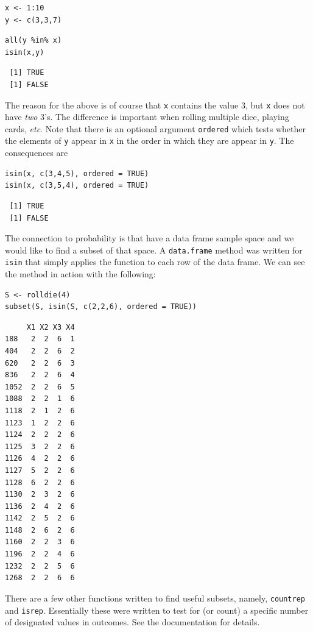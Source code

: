 \documentclass[captions=tableheading]{scrbook}
\begin{document}
\begin{verbatim}
x <- 1:10 
y <- c(3,3,7)
\end{verbatim}


\begin{verbatim}
all(y %in% x)
isin(x,y)
\end{verbatim}

\begin{verbatim}
 [1] TRUE
 [1] FALSE
\end{verbatim}

The reason for the above is of course that \texttt{x} contains the value 3, but \texttt{x} does not have \emph{two} 3's. The difference is important when rolling multiple dice, playing cards, \emph{etc}. Note that there is an optional argument \texttt{ordered} which tests whether the elements of \texttt{y} appear in \texttt{x} in the order in which they are appear in \texttt{y}. The consequences are 


\begin{verbatim}
isin(x, c(3,4,5), ordered = TRUE) 
isin(x, c(3,5,4), ordered = TRUE)
\end{verbatim}

\begin{verbatim}
 [1] TRUE
 [1] FALSE
\end{verbatim}

The connection to probability is that have a data frame sample space and we would like to find a subset of that space. A \texttt{data.frame} method was written for \texttt{isin} that simply applies the function to each row of the data frame. We can see the method in action with the following: 


\begin{verbatim}
S <- rolldie(4) 
subset(S, isin(S, c(2,2,6), ordered = TRUE))
\end{verbatim}


\begin{verbatim}
     X1 X2 X3 X4
188   2  2  6  1
404   2  2  6  2
620   2  2  6  3
836   2  2  6  4
1052  2  2  6  5
1088  2  2  1  6
1118  2  1  2  6
1123  1  2  2  6
1124  2  2  2  6
1125  3  2  2  6
1126  4  2  2  6
1127  5  2  2  6
1128  6  2  2  6
1130  2  3  2  6
1136  2  4  2  6
1142  2  5  2  6
1148  2  6  2  6
1160  2  2  3  6
1196  2  2  4  6
1232  2  2  5  6
1268  2  2  6  6
\end{verbatim}

There are a few other functions written to find useful subsets, namely, \texttt{countrep} and \texttt{isrep}. Essentially these were written to test for (or count) a specific number of designated values in outcomes. See the documentation for details.
\end{document}
